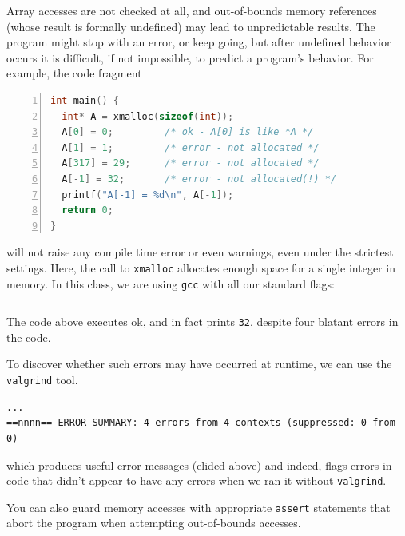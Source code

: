 Array accesses are not checked at all, and out-of-bounds memory
references (whose result is formally undefined) may lead to
unpredictable results. The program might stop with an error, or keep
going, but after undefined behavior occurs it is difficult, if not
impossible, to predict a program's behavior. For example, the code
fragment
\begin{lstlisting}[language=c, numbers=left]
int main() {
  int* A = xmalloc(sizeof(int));
  A[0] = 0;         /* ok - A[0] is like *A */
  A[1] = 1;         /* error - not allocated */
  A[317] = 29;      /* error - not allocated */
  A[-1] = 32;       /* error - not allocated(!) */
  printf("A[-1] = %d\n", A[-1]);
  return 0;
}
\end{lstlisting}
will not raise any compile time error or even warnings, even under the
strictest settings.  Here, the call to \lstinline'xmalloc' allocates enough
space for a single integer in memory.  In this class, we are using
\lstinline'gcc' with all our standard flags:

\begin{lstlisting}[language={[coin]C}]
% gcc -Wall -Wextra -Wshadow -Werror -std=c99 -pedantic -g
\end{lstlisting}
The code
above executes ok, and in fact prints \lstinline'32', despite four blatant
errors in the code.

To discover whether such errors may have occurred
at runtime, we can use the \lstinline'valgrind' tool.
\begin{lstlisting}[language={[coin]C}]
% valgrind ./a.out
...
==nnnn== ERROR SUMMARY: 4 errors from 4 contexts (suppressed: 0 from 0)
\end{lstlisting}
which produces useful error messages (elided above) and indeed,
flags errors in code that didn't appear to have any errors when we ran
it without \lstinline'valgrind'.


You can also guard memory accesses with appropriate \lstinline'assert'
statements that abort the program when attempting out-of-bounds accesses.

